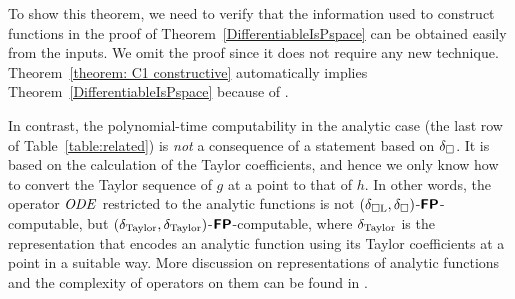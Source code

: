 To show this theorem,
we need to verify that the information used to construct functions in the proof of Theorem~\ref{DifferentiableIsPspace}
can be obtained easily from the inputs.
We omit the proof since it does not require any new technique.
Theorem~\ref{theorem: C1 constructive}
automatically implies Theorem~\ref{DifferentiableIsPspace} 
because of \cite[Lemmas 3.7 and 3.8]{kawamura2010operators}. 


In contrast, 
the polynomial-time computability in the analytic case
(the last row of Table~\ref{table:related})
is \emph{not} a consequence of a statement based on $\delta _\square$. 
It is based on the calculation of the Taylor coefficients, 
and hence we only know how 
to convert the Taylor sequence of $g$ at a point to that of $h$. 
In other words, 
the operator $\mathit{ODE}$ restricted to the analytic functions
is not $(\delta _{\square \mathrm L}, \delta _\square)$-$\text{\bfseries \sffamily \upshape FP}$-computable, 
but $(\delta _{\mathrm{Taylor}}, \delta _{\mathrm{Taylor}})$-$\text{\bfseries \sffamily \upshape FP}$-computable, 
where $\delta _{\mathrm{Taylor}}$ is the representation that 
encodes an analytic function using its Taylor coefficients at a point 
in a suitable way. 
More discussion on representations of analytic functions 
and the complexity of operators on them 
can be found in 
\cite{kawamura12:_unifor_polyt_comput_operat_univar}. 